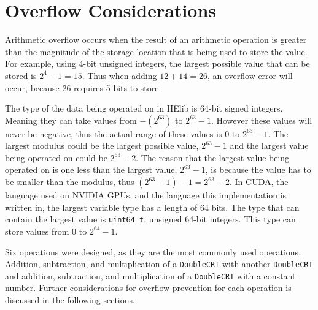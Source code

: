 \section{Overflow Considerations} \label{sec:OverflowConsiderations}
Arithmetic overflow occurs when the result of an arithmetic operation is greater than the magnitude of the storage location that is being used to store the value. For example, using 4-bit unsigned integers, the largest possible value that can be stored is $2^{4} - 1 = 15$. Thus when adding $12 + 14 = 26$, an overflow error will occur, because $26$ requires 5 bits to store. 

The type of the data being operated on in HElib is 64-bit signed integers. Meaning they can take values from $-(2^{63})$ to $2^{63} - 1$. However these values will never be negative, thus the actual range of these values is $0$ to $2^{63} - 1$. The largest modulus could be the largest possible value, $2^{63} - 1$ and the largest value being operated on could be $2^{63} - 2$. The reason that the largest value being operated on is one less than the largest value, $2^{63} - 1$, is because the value has to be smaller than the modulus, thus $(2^{63} - 1) - 1 = 2^{63} - 2$. In CUDA, the language used on NVIDIA GPUs, and the language this implementation is written in, the largest variable type has a length of 64 bits. The type that can contain the largest value is \verb|uint64_t|, unsigned 64-bit integers. This type can store values from 0 to $2^{64} - 1$.

Six operations were designed, as they are the most commonly used operations. Addition, subtraction, and multiplication of a \verb|DoubleCRT| with another \verb|DoubleCRT| and addition, subtraction, and multiplication of a \verb|DoubleCRT| with a constant number. Further considerations for overflow prevention for each operation is discussed in the following sections.

